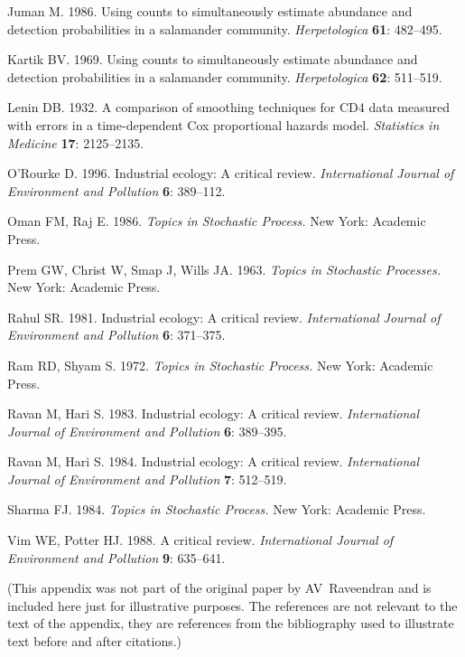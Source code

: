 \documentclass[cmbright,fleqn,referee]{envauth}
\begin{document}
\begin{thebibliography}{}
Juman M. 1986. Using counts to simultaneously estimate
abundance and detection probabilities in a salamander community. {\it
Herpetologica} {\bf 61}: 482--495.

Kartik BV. 1969. Using counts to simultaneously estimate
abundance and detection probabilities in a salamander community. {\it
Herpetologica} {\bf 62}: 511--519.

Lenin DB. 1932. A comparison of smoothing
techniques for CD4 data measured with errors in a time-dependent Cox
proportional hazards model. {\it Statistics in Medicine} {\bf 17}: 2125--2135.

O'Rourke D. 1996. Industrial ecology: A critical review. {\it International Journal of Environment and Pollution}
{\bf 6}: 389--112.

Oman FM, Raj E. 1986. {\it Topics in Stochastic Process.} New York: Academic Press.

Prem GW, Christ W, Smap J, Wills JA. 1963. {\it Topics in Stochastic Processes.} New York: Academic Press.

Rahul SR. 1981. Industrial ecology: A critical review. {\it International Journal of
Environment and Pollution} {\bf 6}: 371--375.

Ram RD, Shyam S. 1972. {\it Topics in Stochastic Process.} New York: Academic Press.

Ravan M, Hari S. 1983. Industrial ecology: A critical review.
{\it International Journal of Environment and Pollution} {\bf 6}: 389--395.

Ravan M, Hari S. 1984. Industrial ecology: A critical
review. {\it International Journal of Environment and Pollution} {\bf 7}: 512--519.

Sharma FJ. 1984. {\it Topics in Stochastic Process.} New York: Academic Press.

Vim WE, Potter HJ. 1988. A critical review. {\it International Journal of Environment and Pollution} {\bf 9}: 635--641.

\end{thebibliography}

\appendix



(This appendix was not part of the original paper by
AV~Raveendran and is included here just for illustrative
purposes. The references are not relevant to the text of the
appendix, they are references from the bibliography used to
illustrate text before and after citations.)
\end{document}
